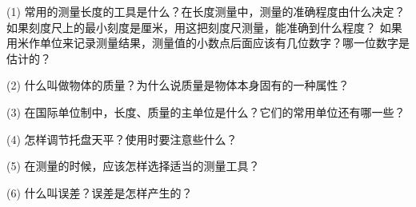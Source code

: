 \label{sec:1-fuxi}

(1) 常用的测量长度的工具是什么？在长度测量中，测量的准确程度由什么决定？
如果刻度尺上的最小刻度是厘米，用这把刻度尺测量，能准确到什么程度？
如果用米作单位来记录测量结果，测量值的小数点后面应该有几位数字？哪一位数字是估计的？

(2) 什么叫做物体的质量？为什么说质量是物体本身固有的一种属性？

(3) 在国际单位制中，长度、质量的主单位是什么？它们的常用单位还有哪一些？

(4) 怎样调节托盘天平？使用时要注意些什么？

(5) 在测量的时候，应该怎样选择适当的测量工具？

(6) 什么叫误差？误差是怎样产生的？

